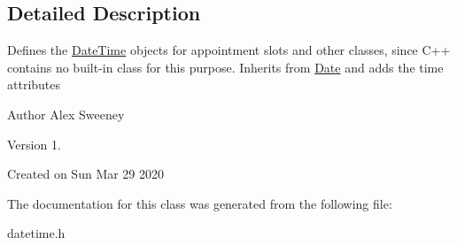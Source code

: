 \subsection{Detailed Description}
Defines the \hyperlink{structDateTime}{Date\-Time} objects for appointment slots and other classes, since C++ contains no built-\/in class for this purpose. Inherits from \hyperlink{structDate}{Date} and adds the time attributes

\begin{DoxyAuthor}{Author}
Alex Sweeney
\end{DoxyAuthor}
\begin{DoxyVersion}{Version}
1.
\end{DoxyVersion}
Created on Sun Mar 29 2020 

The documentation for this class was generated from the following file\-:\begin{DoxyCompactItemize}
\item 
datetime.\-h\end{DoxyCompactItemize}
